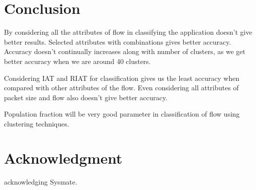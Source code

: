 \documentclass[conference]{IEEEtran}
\begin{document}



\section{Conclusion}
By considering all the attributes of flow in classifying the application doesn't give better results. Selected attributes with combinations gives better accuracy. Accuracy doesn't continually increases along with number of clusters, as we get better accuracy when we are around 40 clusters. 

Considering IAT and RIAT for classification gives us the least accuracy when compared with other attributes of the flow. Even considering all attributes of packet size and flow also doesn't give better accuracy. 

Population fraction will be very good parameter in classification of flow using clustering techniques. 




\section*{Acknowledgment}
acknowledging Sysmate.








%






\end{document}
